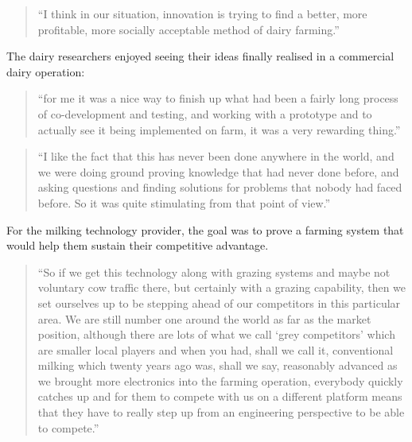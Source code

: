 \begin{quote}
\small
\enquote{I think in our situation, innovation is trying to find a better, more profitable, more socially acceptable method of dairy farming.} \\
\end{quote}

The dairy researchers enjoyed seeing their ideas finally realised in a commercial dairy operation:

\begin{quote}
\small
\enquote{for me it was a nice way to finish up what had been a fairly long process of co-development and testing, and working with a prototype and to actually see it being implemented on farm, it was a very rewarding thing.} \\
\end{quote}

\begin{quote}
\small
\enquote{I like the fact that this has never been done anywhere in the world, and we were doing ground proving knowledge that had never done before, and asking questions and finding solutions for problems that nobody had faced before. So it was quite stimulating from that point of view.} \\
\end{quote}

For the milking technology provider, the goal was to prove a farming system that would help them sustain their competitive advantage. 

\begin{quote}
\small
\enquote{So if we get this technology along with grazing systems and maybe not voluntary cow traffic there, but certainly with a grazing capability, then we set ourselves up to be stepping ahead of our competitors in this particular area.  We are still number one around the world as far as the market position, although there are lots of what we call \enquote{grey competitors} which are smaller local players and when you had, shall we call it, conventional milking which twenty years ago was, shall we say, reasonably advanced as we brought more electronics into the farming operation, everybody quickly catches up and for them to compete with us on a different platform means that they have to really step up from an engineering perspective to be able to compete.} \\
\end{quote}


















